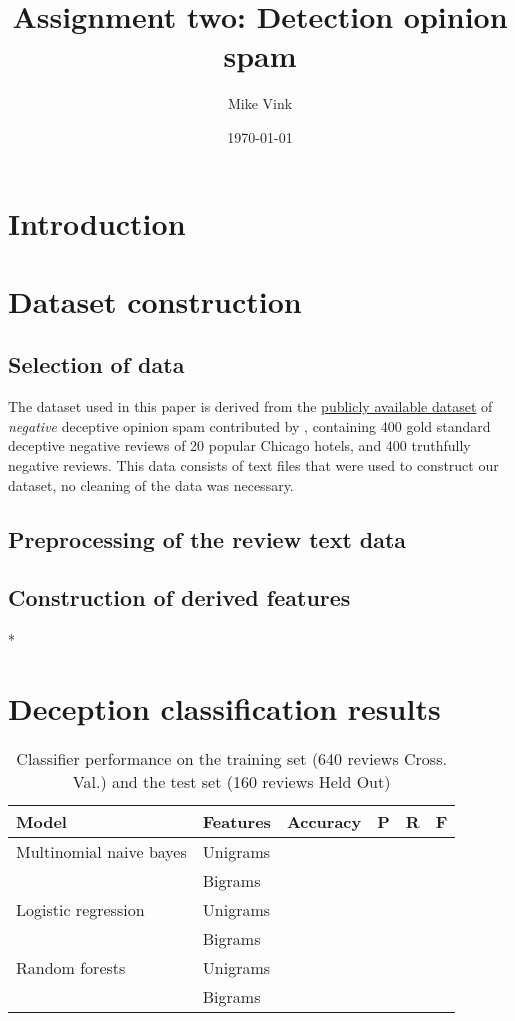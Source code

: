 \documentclass[11pt]{article}
\author{Mike Vink}
\date{\today}
\title{Assignment two: Detection opinion spam}
\begin{document}
\maketitle
\tableofcontents



\section{Introduction}
\label{sec:org568d161}


\section{Dataset construction}
\label{sec:org532e23e}

\subsection{Selection of data}
\label{sec:org3a9c95a}

The dataset used in this paper is derived from the \href{https://myleott.com/op-spam.html}{publicly available dataset} of
\emph{negative} deceptive opinion spam contributed by \cite{ott2013negative}, containing
400 gold standard deceptive negative reviews of 20 popular Chicago hotels, and
400 truthfully negative reviews. This data consists of text files that were used
to construct our dataset, no cleaning of the data was necessary.

\subsection{Preprocessing of the review text data}
\label{sec:org2aea012}



\subsection{Construction of derived features}
\label{sec:org5f5758e}

*

\section{Deception classification results}
\label{sec:orgf6532a7}

\begin{table}[htbp]
\caption{Classifier performance on the training set (640 reviews Cross. Val.) and the test set (160 reviews Held Out)}
\centering
\begin{tabular}{|l|l|l|l|l|l|}
\hline
Model & Features & Accuracy & P & R & F \\
\hline
Multinomial naive bayes & Unigrams & & & & \\
\hline
 & Bigrams & & & & \\
\hline
Logistic regression & Unigrams & & & & \\
\hline
 & Bigrams & & & & \\
\hline
Random forests & Unigrams & & & & \\
\hline
 & Bigrams & & & & \\
\hline
\end{tabular}
\end{table}
\end{document}
